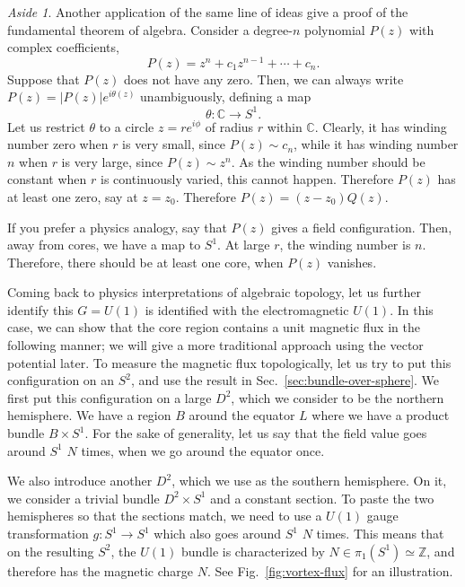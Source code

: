 \documentclass[12pt]{article}
\numberwithin{equation}{section}
\numberwithin{figure}{section}
\theoremstyle{remark}
\newtheorem{aside}[definition]{Aside}
\def\bC{\mathbb{C}}
\def\bZ{\mathbb{Z}}
\begin{document}
\begin{aside}
Another application of the same line of ideas give a proof of the fundamental theorem of algebra.
Consider a degree-$n$ polynomial $P(z)$ with complex coefficients, \begin{equation}
P(z)=z^n + c_1 z^{n-1} +\cdots + c_n.
\end{equation}
Suppose that $P(z)$ does not have any zero.
Then, we can always write $P(z)=|P(z)| e^{i\theta(z)}$ unambiguously,
defining a map \begin{equation}
\theta: \bC \to S^1.
\end{equation}
Let us restrict $\theta$ to a circle $z=r e^{i\phi}$  of radius $r$ within $\bC$.
Clearly, it has winding number zero when $r$ is very small, since $P(z) \sim c_n$,
while it has winding number $n$ when $r$ is very large, since $P(z)\sim z^n$.
As the winding number should be constant when $r$ is continuously varied,
this cannot happen.
Therefore $P(z)$ has at least one zero, say at $z=z_0$.
Therefore $P(z)=(z-z_0)Q(z)$.

If you prefer a physics analogy, 
say that $P(z)$ gives a field configuration.
Then, away from cores, we have a map to $S^1$.
At large $r$, the winding number is $n$. 
Therefore, there should be at least one core, when $P(z)$ vanishes.
\end{aside}


Coming back to physics interpretations of algebraic topology,
let us further identify this $G=U(1)$ is identified with the electromagnetic $U(1)$.
In this case, we can show that the core region contains a unit magnetic flux in the following manner;
we will give a more traditional approach using the vector potential later.
To measure the magnetic flux topologically,
let us try to put this configuration on an $S^2$, and use the result in Sec.~\ref{sec:bundle-over-sphere}.
We first put this configuration on a large $D^2$, which we consider to be the northern hemisphere.
We have a region $B$ around the equator $L$ 
where we have a product bundle $B \times S^1$.
For the sake of generality,
let us say that the field value  goes around $S^1$ $N$ times, when we go around the equator once.

We also introduce another $D^2$, which we use as the southern hemisphere.
On it, we consider a trivial bundle $D^2\times S^1$ and a constant section.
To paste the two hemispheres so that the sections match, 
we need to use a $U(1)$ gauge transformation $g:S^1\to S^1$ which also goes around $S^1$ $N$ times.
This means that on the resulting $S^2$, the $U(1)$ bundle
is characterized by $N\in \pi_1(S^1)\simeq \bZ$,
and therefore has the magnetic charge $N$.
See Fig.~\ref{fig:vortex-flux} for an illustration.
\end{document}
